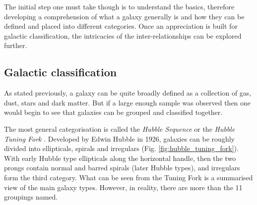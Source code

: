 \documentclass[12pt, twocolumn]{revtex4}    %
\begin{document}



The initial step one must take though is to understand the basics, therefore developing a comprehension of what a galaxy generally is and how they can be defined and placed into different categories. Once an appreciation is built for galactic classification, the intricacies of the inter-relationships can be explored further. 


\subsection{Galactic classification}

As stated previously, a galaxy can be quite broadly defined as a collection of gas, dust, stars and dark matter. But if a large enough sample was observed then one would begin to see that galaxies can be grouped and classified together.

The most general categorisation is called the \textit{Hubble Sequence} or the \textit{Hubble Tuning Fork} \citep{carroll_astro}. Developed by Edwin Hubble in 1926, galaxies can be roughly divided into ellipticals, spirals and irregulars (Fig. \ref{fig:hubble_tuning_fork}). With early Hubble type ellipticals along the horizontal handle, then the two prongs contain normal and barred spirals (later Hubble types), and irregulars form the third category. What can be seen from the Tuning Fork is a summarised view of the main galaxy types. However, in reality, there are more than the 11 groupings named.
\end{document}
